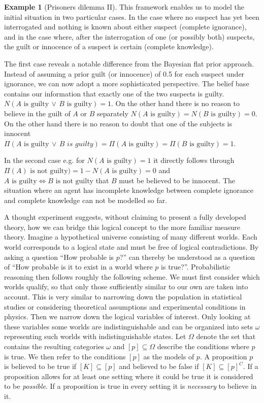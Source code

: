 \documentclass[
]{report}
\theoremstyle{definition}
\newtheorem{example}{Example}[section]
\begin{document}
\begin{example}[Prisoners dilemma II]
This framework enables us to model the initial situation in two particular cases. In the case where no suspect has yet been interrogated and nothing is known about either suspect (complete ignorance), and in the case where, after the interrogation of one (or possibly both) suspects, the guilt or innocence of a suspect is certain (complete knowledge).

The first case reveals a notable difference from the Bayesian flat prior approach. Instead of assuming a prior guilt (or innocence) of 0.5 for each suspect under ignorance, we can now adopt a more sophisticated perspective. The belief base contains our information that exactly one of the two suspects is guilty. $N(A \text{ is guilty} \, \lor \, B \text{ is guilty}) = 1$. On the other hand there is no reason to believe in the guilt of $A$ or $B$ separately $N(A \text{ is guilty}) = N(B \text{ is guilty}) = 0$. On the other hand there is no reason to doubt that one of the subjects is innocent $\Pi(A \text{ is guilty} \, \lor \, B \textit{ is guilty}) = \Pi (A \text{ is guilty}) = \Pi (B \text{ is guilty}) = 1$. 

In the second case e.g. for $N(A \text{ is guilty}) = 1$ it directly follows through $\Pi(A) \text{ is not guilty}) = 1 -  N(A \text{ is guilty}) = 0$ and $A \text{ is guilty} \Leftrightarrow B \text{ is not guilty}$ that $B$ must be believed to be innocent. The situation where an agent has incomplete knowledge between complete ignorance and complete knowledge can not be modelled so far.
\end{example}

A thought experiment suggests, without claiming to present a fully
developed theory, how we can bridge this logical concept to the more
familiar measure theory. Imagine a hypothetical universe consisting of
many different worlds. Each world corresponds to a logical state and
must be free of logical contradictions. By asking a question ``How
probable is \(p\)?'' can thereby be understood as a question of ``How
probable is it to exist in a world where \(p\) is true?''. Probabilistic
reasoning then follows roughly the following scheme. We must first
consider which worlds qualify, so that only those sufficiently similar
to our own are taken into account. This is very similar to narrowing
down the population in statistical studies or considering theoretical
assumptions and experimental conditions in physics. Then we narrow down
the logical variables of interest. Only looking at these variables some
worlds are indistinguishable and can be organized into sets \(\omega\)
representing such worlds with indistinguishable states. Let \(\Omega\)
denote the set that contains the resulting categories \(\omega\) and
\([p] \subseteq \Omega\) describe the conditions where \(p\) is true. We
then refer to the conditions \([p]\) as the models of \(p\). A
proposition \(p\) is believed to be true if \([K] \subseteq [p]\) and
believed to be false if \([K] \subseteq [p]^C\). If a proposition allows
for at least one setting where it could be true it is considered to be
\textit{possible}. If a proposition is true in every setting it is
\textit{necessary} to believe in it.
\end{document}
